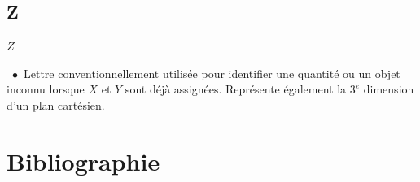\documentclass[10.5pt,a4paper]{article}
\renewcommand{\footnotesize}{\scriptsize}
\newcommand{\entry}[3]{\normalsize{\textbf{#1}}\markboth{#1}{#1}\ $\bullet$\ \footnotesize{#2}\ \footnotesize{#3}} %
\begin{document}
\begin{multicols}{2}
\section*{Z}

\entry{$Z$}{Lettre conventionnellement utilisée pour identifier une quantité ou un objet inconnu lorsque $X$ et $Y$ sont déjà assignées. Représente également la $3^{e}$ dimension d'un plan cartésien.}{}

\end{multicols}

\pagebreak

\section{Bibliographie}
\begingroup
\renewcommand{\section}[2]{}


\vspace{10cm}
\endgroup
\end{document}
